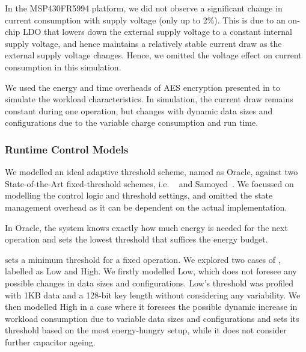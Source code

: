 

In the MSP430FR5994 platform, we did not observe a significant change in current consumption with supply voltage (only up to 2\%). 
This is  due to an on-chip LDO that lowers down the external supply voltage to a constant internal supply voltage, and hence maintains a relatively stable current draw as the external supply voltage changes. 
Hence, we omitted the voltage effect on current consumption in this simulation. 

We used the energy and time overheads of AES encryption presented in  to simulate the workload characteristics. 
In simulation, the current draw remains constant during one operation, but changes with dynamic data sizes and configurations due to the variable charge consumption and run time.

\subsubsection{Runtime Control Models}

We modelled an ideal adaptive threshold scheme, named as \nn{} Oracle, against two State-of-the-Art fixed-threshold schemes, i.e. \debs{}~\cite{gomez2016dynamic} and Samoyed~\cite{maeng2019supporting}.
We focussed on modelling the control logic and threshold settings, and omitted the state management overhead as it can be dependent on the actual implementation. 

In \nn{} Oracle, the system knows exactly how much energy is needed for the next operation and sets the lowest threshold that suffices the energy budget. 

\debs{} sets a minimum threshold for a fixed operation. 
We explored two cases of \debs{}, labelled as \debs{} Low and \debs{} High.
We firstly modelled \debs{} Low, which does not foresee any possible changes in data sizes and configurations. 
\debs{} Low's threshold was profiled with 1KB data and a 128-bit key length without considering any variability. 
We then modelled \debs{} High in a case where it foresees the possible dynamic increase in workload consumption due to variable data sizes and configurations and sets its threshold based on the most energy-hungry setup, while it does not consider further capacitor ageing.

